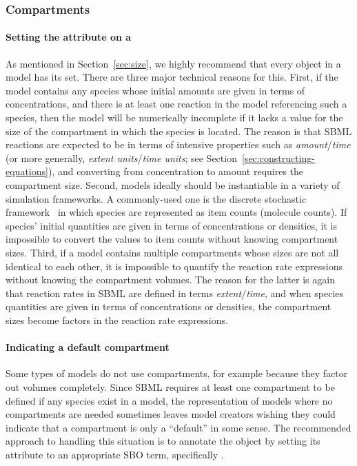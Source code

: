 \subsubsection{Compartments}
\label{sec:bp:compartment}


\paragraph{Setting the  attribute on a }
\label{sec:bp:size}

As mentioned in Section~\ref{sec:size}, we highly recommend that
every \Compartment object in a model has its  set.
There are three major technical reasons for this.  First, if the
model contains any species whose initial amounts are given in
terms of concentrations, and there is at least one reaction in the
model referencing such a species, then the model will be
numerically incomplete if it lacks a value for the size of the
compartment in which the species is located.  The reason is that
SBML reactions are expected to be in terms of intensive properties
such as \emph{amount}/\emph{time} (or more generally, \emph{extent
  units}/\emph{time units}; see
Section~\ref{sec:constructing-equations}), and converting from
concentration to amount requires the compartment size.  Second,
models ideally should be instantiable in a variety of simulation
frameworks.  A commonly-used one is the discrete stochastic
framework~\citep{gillespie:1977,wilkinson_2006} in which species
are represented as item counts (\eg molecule counts).  If species'
initial quantities are given in terms of concentrations or
densities, it is impossible to convert the values to item counts
without knowing compartment sizes.  Third, if a model contains
multiple compartments whose sizes are not all identical to each
other, it is impossible to quantify the reaction rate expressions
without knowing the compartment volumes.  The reason for the
latter is again that reaction rates in SBML are defined in terms
\emph{extent}/\emph{time}, and when species quantities are given
in terms of concentrations or densities, the compartment sizes
become factors in the reaction rate expressions.


\paragraph{Indicating a default compartment}

Some types of models do not use compartments, for example because
they factor out volumes completely.  Since SBML requires at least
one compartment to be defined if any species exist in a model, the
representation of models where no compartments are needed
sometimes leaves model creators wishing they could indicate that a
compartment is only a ``default'' in some sense.  The recommended
approach to handling this situation is to annotate the
\Compartment object by setting its  attribute to an
appropriate SBO term, specifically .


